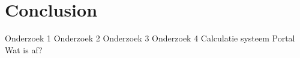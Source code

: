 \graphicspath{{Chapter7/Figs/Vector/}{Chapter7/Figs/}}

%
\chapter{Conclusion}

Onderzoek 1
Onderzoek 2
Onderzoek 3
Onderzoek 4
Calculatie systeem
Portal
Wat is af?


